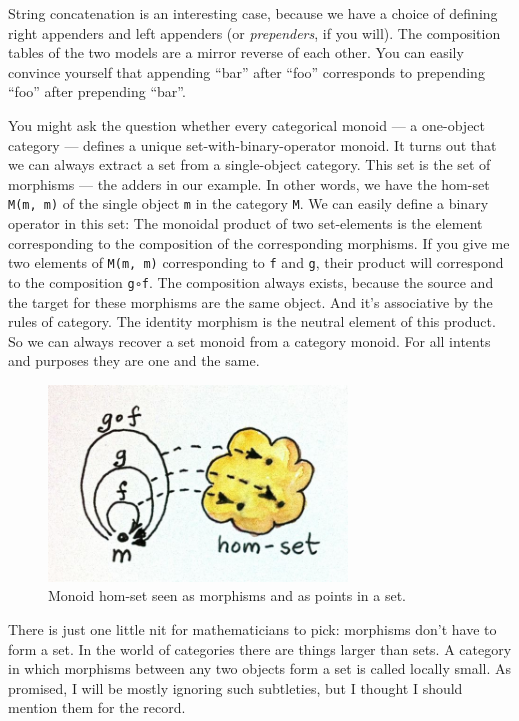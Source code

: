 String concatenation is an interesting case, because we have a choice of
defining right appenders and left appenders (or \emph{prependers}, if
you will). The composition tables of the two models are a mirror reverse
of each other. You can easily convince yourself that appending ``bar''
after ``foo'' corresponds to prepending ``foo'' after prepending
``bar''.

You might ask the question whether every categorical monoid --- a
one-object category --- defines a unique set-with-binary-operator
monoid. It turns out that we can always extract a set from a
single-object category. This set is the set of morphisms --- the adders
in our example. In other words, we have the hom-set \texttt{M(m, m)} of the
single object \texttt{m} in the category \texttt{M}. We can easily define a binary
operator in this set: The monoidal product of two set-elements is the
element corresponding to the composition of the corresponding morphisms.
If you give me two elements of \texttt{M(m, m)} corresponding to \texttt{f} and
\texttt{g}, their product will correspond to the composition
\texttt{g∘f}. The composition always exists, because the source and the
target for these morphisms are the same object. And it's associative by
the rules of category. The identity morphism is the neutral element of
this product. So we can always recover a set monoid from a category
monoid. For all intents and purposes they are one and the same.

\begin{figure}
  \centering
          \includegraphics[width=3.12500in]{images/monoidhomset.jpg}
      \captionsetup{labelformat=empty,font=scriptsize}
      \caption{Monoid hom-set seen as morphisms and as points in a set.}
\end{figure}

There is just one little nit for mathematicians to pick: morphisms don't
have to form a set. In the world of categories there are things larger
than sets. A category in which morphisms between any two objects form a
set is called locally small. As promised, I will be mostly ignoring such
subtleties, but I thought I should mention them for the record.

